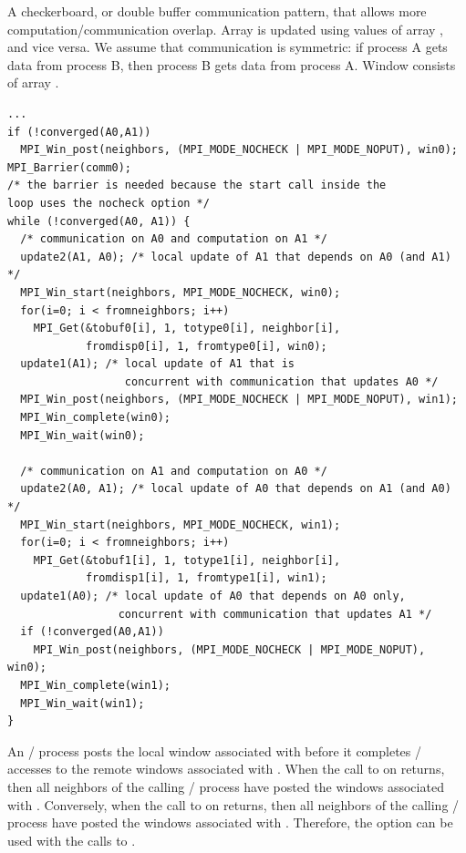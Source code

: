 \begin{example}
%
A checkerboard, or double buffer  communication pattern, that allows
more computation/communication overlap.  Array  is updated
using values of array , and vice versa.  We assume that communication is symmetric: if process A gets data from process B, then process B gets data from process A.  Window  consists of array .
\begin{lstlisting}[language={[MPI]C}]
...
if (!converged(A0,A1))
  MPI_Win_post(neighbors, (MPI_MODE_NOCHECK | MPI_MODE_NOPUT), win0);
MPI_Barrier(comm0);
/* the barrier is needed because the start call inside the
loop uses the nocheck option */
while (!converged(A0, A1)) {
  /* communication on A0 and computation on A1 */
  update2(A1, A0); /* local update of A1 that depends on A0 (and A1) */
  MPI_Win_start(neighbors, MPI_MODE_NOCHECK, win0);
  for(i=0; i < fromneighbors; i++)
    MPI_Get(&tobuf0[i], 1, totype0[i], neighbor[i],
            fromdisp0[i], 1, fromtype0[i], win0);
  update1(A1); /* local update of A1 that is
                  concurrent with communication that updates A0 */ 
  MPI_Win_post(neighbors, (MPI_MODE_NOCHECK | MPI_MODE_NOPUT), win1);
  MPI_Win_complete(win0);
  MPI_Win_wait(win0);

  /* communication on A1 and computation on A0 */
  update2(A0, A1); /* local update of A0 that depends on A1 (and A0) */
  MPI_Win_start(neighbors, MPI_MODE_NOCHECK, win1);
  for(i=0; i < fromneighbors; i++)
    MPI_Get(&tobuf1[i], 1, totype1[i], neighbor[i],
            fromdisp1[i], 1, fromtype1[i], win1);
  update1(A0); /* local update of A0 that depends on A0 only,
                 concurrent with communication that updates A1 */
  if (!converged(A0,A1))
    MPI_Win_post(neighbors, (MPI_MODE_NOCHECK | MPI_MODE_NOPUT), win0);
  MPI_Win_complete(win1);
  MPI_Win_wait(win1);
}
\end{lstlisting}

An \mpi/ process posts the local window associated with
 before it completes \RMA/ accesses to
the remote windows associated with .
When the call to  on 
returns, then all neighbors of the calling \mpi/ process have posted the
windows associated with . Conversely, when the 
call to  on  returns, then all neighbors of the calling \mpi/ process
have posted the windows associated with .
Therefore, the  option can be used with the calls to
.


\end{example}
